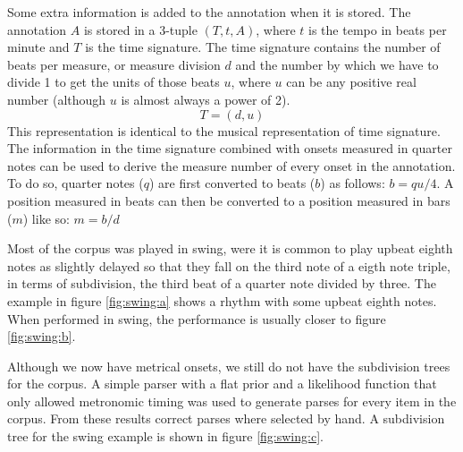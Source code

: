Some extra information is added to the annotation when it is stored. The annotation $A$ is stored in a 3-tuple $(T, t, A)$, where $t$ is the tempo in beats per minute and $T$ is the time signature. The time signature contains the number of beats per measure, or measure division $d$ and the number by which we have to divide 1 to get the units of those beats $u$, where $u$ can be any positive real number (although $u$ is almost always a power of 2). 
\begin{equation*}
T = (d, u)
\end{equation*}
This representation is identical to the musical representation of time signature. The information in the time signature combined with onsets measured in quarter notes can be used to derive the measure number of every onset in the annotation. To do so, quarter notes ($q$) are first converted to beats ($b$) as follows: $b = qu/4$. A position measured in beats can then be converted to a position measured in bars ($m$) like so: $m = b/d$

Most of the corpus was played in swing, were it is common to play upbeat eighth notes as slightly delayed so that they fall on the third note of a eigth note triple, in terms of subdivision, the third beat of a quarter note divided by three. The example in figure \ref{fig:swing:a} shows a rhythm with some upbeat eighth notes. When performed in swing, the performance is usually closer to figure \ref{fig:swing:b}.

Although we now have metrical onsets, we still do not have the subdivision trees for the corpus. A simple parser with a flat prior and a likelihood function that only allowed metronomic timing was used to generate parses for every item in the corpus. From these results correct parses where selected by hand. A subdivision tree for the swing example is shown in figure \ref{fig:swing:c}.


